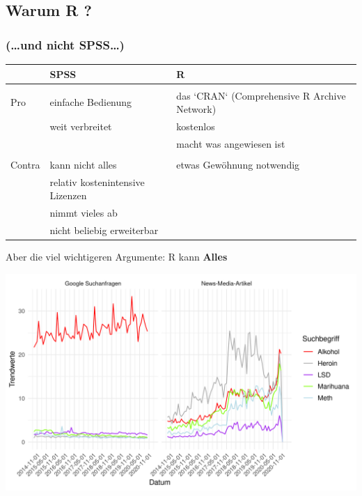 \documentclass[
]{book}
\begin{document}
\hypertarget{warum-r}{%
\subsection*{Warum R ?}\label{warum-r}}

\hypertarget{und-nicht-spss}{%
\subsubsection*{(\ldots und nicht SPSS\ldots)}\label{und-nicht-spss}}

\begin{table}
\centering
\begin{tabular}[t]{l|l|l}
\hline
  & SPSS & R\\
\hline
 &  & \\
\hline
Pro & einfache Bedienung & das `CRAN` (Comprehensive R Archive Network)\\
\hline
 & weit verbreitet & kostenlos\\
\hline
 &  & macht was angewiesen ist\\
\hline
 &  & \\
\hline
Contra & kann nicht alles & etwas Gewöhnung notwendig\\
\hline
 & relativ kostenintensive Lizenzen & \\
\hline
 & nimmt vieles ab & \\
\hline
 & nicht beliebig erweiterbar & \\
\hline
\end{tabular}
\end{table}

Aber die viel wichtigeren Argumente:
R kann \textbf{Alles}

\begin{center}\includegraphics[width=0.7\linewidth]{imgs/drugs} \end{center}
\end{document}
